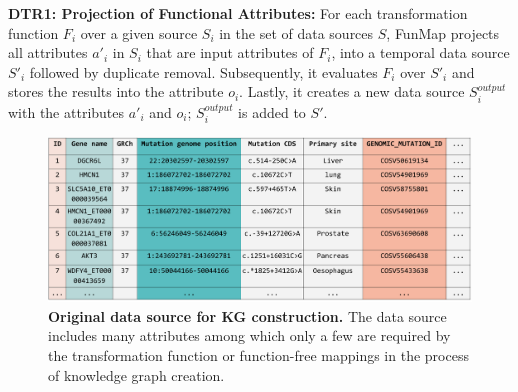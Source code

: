 \noindent\textbf{DTR1: Projection of Functional Attributes:}
For each transformation function $F_i$ over a given source $S_i$ in the set of data sources $S$, FunMap projects all attributes $a'_i$ in $S_i$ that are input attributes of $F_i$, into a temporal data source $S'_i$ followed by duplicate removal. Subsequently, it evaluates $F_i$ over $S'_i$ and stores the results into the attribute $o_i$. Lastly, it creates a new data source $S_{i}^{output}$ with the attributes $a'_i$ and $o_i$; $S_{i}^{output}$ is added to $S'$. 
\begin{figure}[t!]
\includegraphics[width=\textwidth]{figures/OriginalDatasource.png}
\caption[Original data source for KGC]{\textbf{Original data source for KG construction.} The data source includes many attributes among which only a few are required by the transformation function or function-free mappings in the process of knowledge graph creation.} 
\label{fig:OriginalDatasource}
\end{figure}
